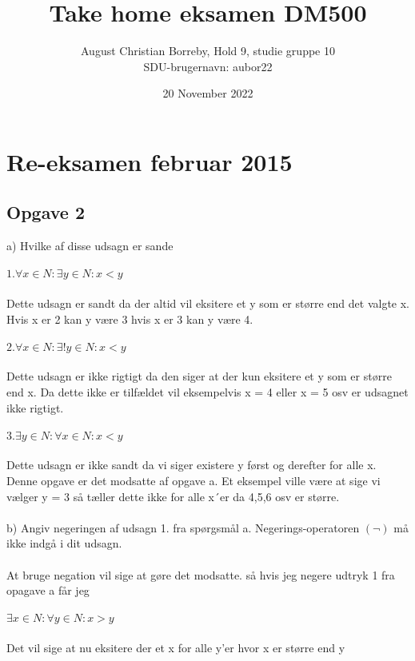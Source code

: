 \documentclass{article}
\title{Take home eksamen DM500}
\author{August Christian Borreby, Hold 9, studie gruppe 10\\ SDU-brugernavn: aubor22}
\date{20 November 2022}
\begin{document}
\maketitle
\section{Re-eksamen februar 2015}
\subsection{Opgave 2}
a) Hvilke af disse udsagn er sande \\ \\
    $1. \forall x \in N: \exists y \in N: x < y $\\ \\
    Dette udsagn er sandt da der altid vil eksitere et y som er større end det valgte x. Hvis x er 2 kan y være 3 hvis x er 3 kan y være 4. \\ \\
    $2. \forall x \in N: \exists! y \in N: x < y$\\ \\
    Dette udsagn er ikke rigtigt da den siger at der kun eksitere et y som er større end x. Da dette ikke er tilfældet vil eksempelvis x = 4 eller x = 5 osv er udsagnet ikke rigtigt.\\ \\
    $3. \exists y \in N: \forall x \in N: x < y$\\ \\
    Dette udsagn er ikke sandt da vi siger existere y først og derefter for alle x. Denne opgave er det modsatte af opgave a. Et eksempel ville være at sige vi vælger y = 3 så tæller dette ikke for alle x´er da 4,5,6 osv er større. 
\\ \\
b) Angiv negeringen af udsagn 1. fra spørgsmål a. Negerings-operatoren $(\neg)$ må ikke indgå i dit udsagn. \\
\\
At bruge negation vil sige at gøre det modsatte. så hvis jeg negere udtryk 1 fra opagave a får jeg \\
\\
$\exists x \in N: \forall y \in N: x > y$ \\
\\
Det vil sige at nu eksitere der et x for alle y'er hvor x er større end y
\end{document}
